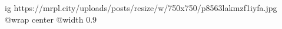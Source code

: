  
 
 
 
 

\ifcmt
  ig https://mrpl.city/uploads/posts/resize/w/750x750/p8563lakmzf1iyfa.jpg
  @wrap center
  @width 0.9
\fi
